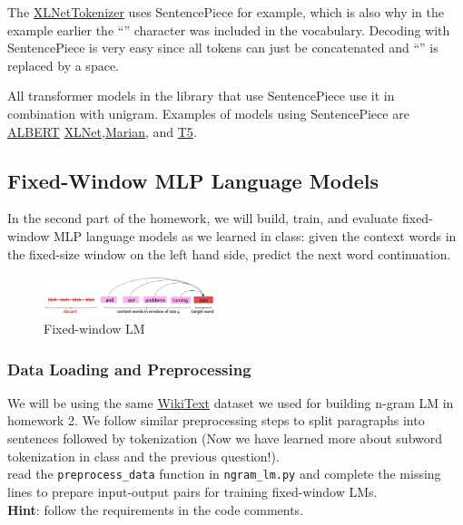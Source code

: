 The \href{https://huggingface.co/docs/transformers/main/en/model_doc/xlnet#transformers.XLNetTokenizer}{XLNetTokenizer} uses SentencePiece for example, which is also why in the example earlier the
``\textunderscore'' character was included in the vocabulary. Decoding with SentencePiece is very easy since all tokens can just be concatenated and ``\textunderscore'' is replaced by a space.

All transformer models in the library that use SentencePiece use it in combination with unigram. Examples of models using SentencePiece are \href{https://huggingface.co/docs/transformers/main/en/model_doc/albert}{ALBERT} \href{https://huggingface.co/docs/transformers/main/en/model_doc/xlnet}{XLNet},\href{https://huggingface.co/docs/transformers/main/en/model_doc/marian}{Marian}, and \href{https://huggingface.co/docs/transformers/main/en/model_doc/t5}{T5}.

\subsection{Fixed-Window MLP Language Models}
In the second part of the homework, we will build, train, and evaluate fixed-window MLP language models as we learned in class: given the context words in the fixed-size window on the left hand side, predict the next word continuation.

\begin{figure}[h]
    \centering
    \includegraphics[width=0.45\textwidth]{figures/fixed_window_lm.png}
    \caption{Fixed-window LM}
\end{figure}

\subsubsection{Data Loading and Preprocessing}
We will be using the same \href{https://huggingface.co/datasets/wikitext}{WikiText} dataset we used for building n-gram LM in homework 2. We follow similar preprocessing steps to split paragraphs into sentences followed by tokenization (Now we have learned more about subword tokenization in class and the previous question!).\\

\noindent\todo{} read the \texttt{preprocess\_data} function in \texttt{ngram\_lm.py} and complete the missing lines to prepare input-output pairs for training fixed-window LMs.\\
\noindent \textbf{Hint}: follow the requirements in the code comments.


